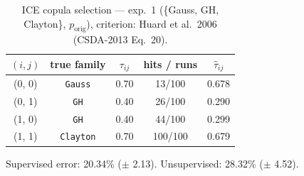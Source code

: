 \begin{table}[htbp]
  \centering
  \caption{ICE copula selection — exp.\ 1 (\{Gauss, GH, Clayton\}, $p_{\text{orig}}$), criterion: Huard et al.\ 2006 (CSDA-2013 Eq.\ 20).}
  \label{tab:exp3-exp1_orig_p__huard}
  \begin{tabular}{ccccc}
    \toprule
    $(i, j)$ & true family & $\tau_{ij}$ & hits / runs & $\hat\tau_{ij}$ \\
    \midrule
    (0, 0) & \texttt{Gauss} & 0.70 & 13/100 & 0.678 \\
    (0, 1) & \texttt{GH} & 0.40 & 26/100 & 0.290 \\
    (1, 0) & \texttt{GH} & 0.40 & 44/100 & 0.299 \\
    (1, 1) & \texttt{Clayton} & 0.70 & 100/100 & 0.679 \\
    \bottomrule
  \end{tabular}
  \par\smallskip Supervised error: 20.34\% ($\pm$ 2.13). Unsupervised: 28.32\% ($\pm$ 4.52).
\end{table}
